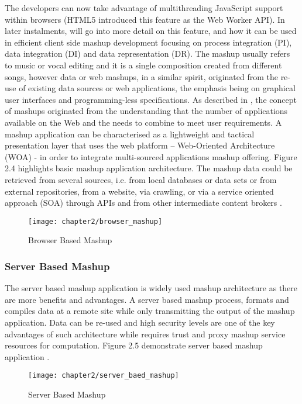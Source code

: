 The developers can now take advantage of multithreading JavaScript support within browsers (HTML5 introduced this feature as the Web Worker API). In later instalments, will go into more detail on this feature, and how it can be used in efficient client side mashup development focusing on process integration (PI), data integration (DI) and data representation (DR). The mashup usually refers to music or vocal editing and it is a single composition created from different songs, however data or web mashups, in a similar spirit, originated from the re-use of existing data sources or web applications, the emphasis being on graphical user interfaces and programming-less specifications. As described in \cite{eick1999visualizing}, the concept of mashups originated from the understanding that the number of applications available on the Web and the needs to combine to meet user requirements. A mashup application can be characterised as a lightweight and tactical presentation layer that uses the web platform – Web-Oriented Architecture (WOA)  - in order to integrate multi-sourced applications mashup offering. Figure 2.4 highlights basic mashup application architecture. The mashup data could be retrieved from several sources, i.e. from local databases or data sets or from external repositories, from a website, via crawling, or via a service oriented approach (SOA) through APIs and from other intermediate content brokers \cite{naik2015framework}. 

\begin{figure}[H]
\centering
\texttt{[image: chapter2/browser\_mashup]}
\caption{Browser Based Mashup }
\end{figure}

\subsubsection{Server Based Mashup}

The server based mashup application is widely used mashup architecture as there are more benefits and advantages. A server based mashup process, formats and compiles data at a remote site while only transmitting the output of the mashup application. Data can be re-used and high security levels are one of the key advantages of such architecture while requires trust and proxy mashup service resources for computation. Figure 2.5  demonstrate server based mashup application \cite{chen2014development}.


\begin{figure}[H]
\centering
\texttt{[image: chapter2/server\_baed\_mashup]}
\caption{Server Based Mashup}
\end{figure}

